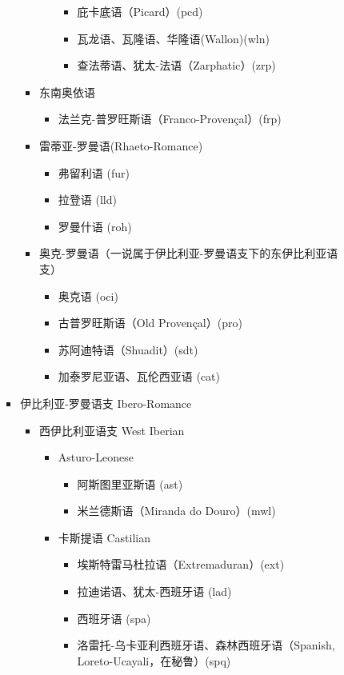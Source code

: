 \documentclass[UTF8,a4paper,titlepage,10pt]{report}
\begin{document}
\begin{enumerate}
\begin{itemize}
\begin{itemize}
\begin{itemize}
\begin{itemize}
\begin{itemize}
\begin{itemize}
\item 庇卡底语（Picard）(pcd)
\item 瓦龙语、瓦隆语、华隆语(Wallon)(wln)
\item 查法蒂语、犹太-法语（Zarphatic）(zrp)
\end{itemize}
\end{itemize}
\item 东南奥依语
\begin{itemize}
\item 法兰克-普罗旺斯语（Franco-Provençal）(frp)
\end{itemize}
\item 雷蒂亚-罗曼语(Rhaeto-Romance)
\begin{itemize}
\item 弗留利语 (fur)
\item 拉登语 (lld)
\item 罗曼什语 (roh)
\end{itemize}
\item 奥克-罗曼语（一说属于伊比利亚-罗曼语支下的东伊比利亚语支）
\begin{itemize}
\item 奥克语 (oci)
\item 古普罗旺斯语（Old Provençal）(pro)
\item 苏阿迪特语（Shuadit）(sdt)
\item 加泰罗尼亚语、瓦伦西亚语 (cat)
\end{itemize}
\end{itemize}
\item 伊比利亚-罗曼语支 Ibero-Romance
\begin{itemize}
\item 西伊比利亚语支 West Iberian
\begin{itemize}
\item Asturo-Leonese
\begin{itemize}
\item 阿斯图里亚斯语 (ast)
\item 米兰德斯语（Miranda do Douro）(mwl)
\end{itemize}
\item 卡斯提语 Castilian
\begin{itemize}
\item 埃斯特雷马杜拉语（Extremaduran）(ext)
\item 拉迪诺语、犹太-西班牙语 (lad)
\item 西班牙语 (spa)
\item 洛雷托-乌卡亚利西班牙语、森林西班牙语（Spanish, Loreto-Ucayali，在秘鲁）(spq)
\end{itemize}

\end{itemize}
\end{itemize}
\end{itemize}
\end{itemize}
\end{itemize}
\end{enumerate}
\end{document}
